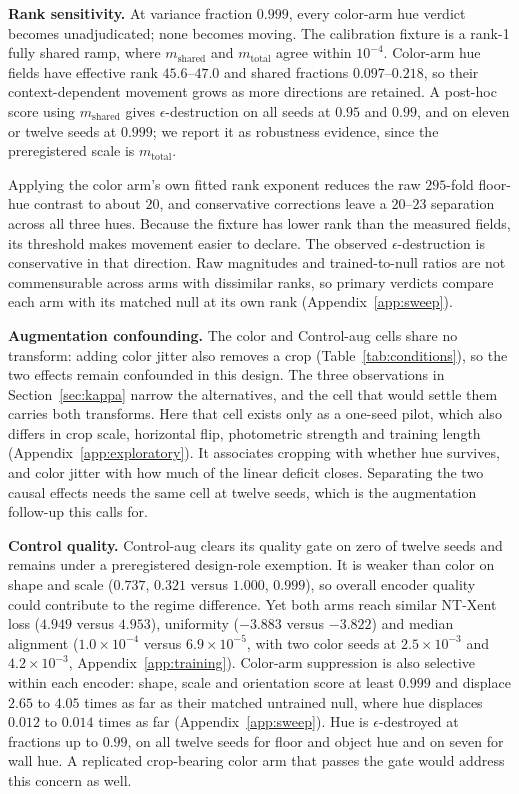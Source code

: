 \documentclass[10pt]{article}
\begin{document}
\textbf{Rank sensitivity.} At variance fraction $0.999$, every color-arm hue verdict becomes
unadjudicated; none becomes moving. The calibration fixture is a rank-1 fully shared ramp, where
$m_{\mathrm{shared}}$ and $m_{\mathrm{total}}$ agree within $10^{-4}$. Color-arm hue fields have
effective rank $45.6$--$47.0$ and shared fractions $0.097$--$0.218$, so their context-dependent
movement grows as more directions are retained. A post-hoc score using $m_{\mathrm{shared}}$ gives
$\epsilon$-destruction on all seeds at $0.95$ and $0.99$, and on eleven or twelve seeds at $0.999$;
we report it as robustness evidence, since the preregistered scale is $m_{\mathrm{total}}$.

Applying the color arm's own fitted rank exponent reduces the raw $295$-fold floor-hue contrast to
about $20$, and conservative corrections leave a $20$--$23$ separation across all three hues.
Because the fixture has lower rank than the measured fields, its threshold makes movement easier to
declare. The observed $\epsilon$-destruction is conservative in that direction. Raw magnitudes and
trained-to-null ratios are not commensurable across arms with dissimilar ranks, so primary verdicts
compare each arm with its matched null at its own rank (Appendix~\ref{app:sweep}).

\textbf{Augmentation confounding.} The color and Control-aug cells share no transform: adding color
jitter also removes a crop (Table~\ref{tab:conditions}), so the two effects remain confounded in
this design. The three observations in Section~\ref{sec:kappa} narrow the alternatives, and the cell
that would settle them carries both transforms. Here that cell exists only as a one-seed pilot,
which also differs in crop scale, horizontal flip, photometric strength and training length
(Appendix~\ref{app:exploratory}). It associates cropping with whether hue survives, and color jitter
with how much of the linear deficit closes. Separating the two causal effects needs the same cell at
twelve seeds, which is the augmentation follow-up this calls for.

\textbf{Control quality.} Control-aug clears its quality gate on zero of twelve seeds and remains
under a preregistered design-role exemption. It is weaker than color on shape and scale
($0.737$, $0.321$ versus $1.000$, $0.999$), so overall encoder quality could contribute to the
regime difference. Yet both arms reach similar NT-Xent loss ($4.949$ versus $4.953$), uniformity
($-3.883$ versus $-3.822$) and median alignment ($1.0\times10^{-4}$ versus $6.9\times10^{-5}$, with two
color seeds at $2.5\times10^{-3}$ and $4.2\times10^{-3}$, Appendix~\ref{app:training}). Color-arm
suppression is also selective within each encoder: shape, scale and orientation score
at least $0.999$ and displace $2.65$ to $4.05$ times as far as their matched untrained null, where
hue displaces $0.012$ to $0.014$ times as far (Appendix~\ref{app:sweep}). Hue is
$\epsilon$-destroyed at fractions up
to $0.99$, on all twelve seeds for floor and object hue and on seven for wall hue. A replicated
crop-bearing color arm that passes the gate would address this concern as well.
\end{document}
